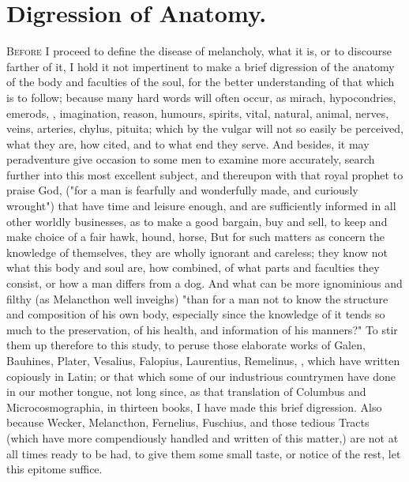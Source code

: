 \section{Digression of Anatomy.}

\lettrine{B}{efore} I proceed to define the disease of melancholy, what it is,
or to discourse farther of it, I hold it not impertinent to make a brief
digression of the anatomy of the body and faculties of the soul, for the better
understanding of that which is to follow; because many hard words will often
occur, as mirach, hypocondries, emerods, \etc{}, imagination, reason, humours,
spirits, vital, natural, animal, nerves, veins, arteries, chylus, pituita;
which by the vulgar will not so easily be perceived, what they are, how cited,
and to what end they serve. And besides, it may peradventure give occasion to
some men to examine more accurately, search further into this most excellent
subject, and thereupon with that royal prophet to praise
God, ("for a man is fearfully and wonderfully made, and curiously wrought")
that have time and leisure enough, and are sufficiently informed in all other
worldly businesses, as to make a good bargain, buy and sell, to keep and make
choice of a fair hawk, hound, horse, \etc{} But for such matters as concern the
knowledge of themselves, they are wholly ignorant and careless; they know not
what this body and soul are, how combined, of what parts and faculties they
consist, or how a man differs from a dog. And what can be more ignominious and
filthy (as Melancthon well inveighs) "than for a man not to
know the structure and composition of his own body, especially since the
knowledge of it tends so much to the preservation, of his health, and
information of his manners?" To stir them up therefore to this study, to peruse
those elaborate works of Galen, Bauhines, Plater, Vesalius,
Falopius, Laurentius, Remelinus, \etc{}, which have written copiously in Latin;
or that which some of our industrious countrymen have done in our mother
tongue, not long since, as that translation of Columbus and
Microcosmographia, in thirteen books, I have made this
brief digression. Also because Wecker,
Melancthon, Fernelius,
Fuschius, and those tedious Tracts  (which have more compendiously handled and written of this matter,) are
not at all times ready to be had, to give them some small taste, or notice of
the rest, let this epitome suffice.

